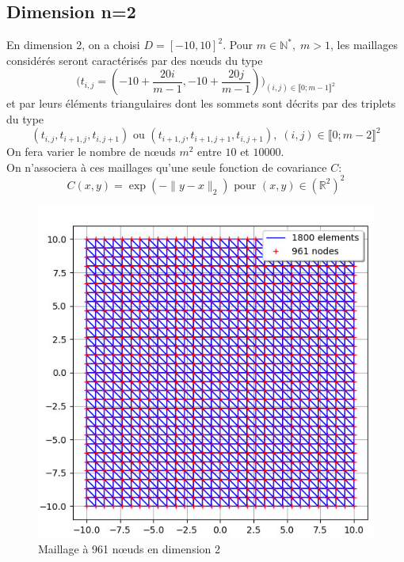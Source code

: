 \subsection{Dimension n=2}
\label{choDim2}
En dimension 2, on a choisi $D = [-10,10]^2$. Pour $m \in \mathbb{N}^{*}, \; m > 1$,
les maillages considérés seront caractérisés par des n\oe uds du type
\begin{equation*} \biggl (t_{i,j} = (-10 + \frac{20i}{m-1}, -10 + \frac{20j}{m-1} )\biggr)_{(i,j) \in \llbracket 0;m-1 \rrbracket^2}  \end{equation*}
et par leurs éléments triangulaires dont les sommets sont décrits par des triplets
du type \begin{equation*}(t_{i,j}, t_{i+1,j}, t_{i,j+1}) \text{ ou } (t_{i+1,j}, t_{i+1,j+1}, t_{i,j+1}) , \; (i,j) \in \llbracket 0;m-2 \rrbracket^2 \end{equation*}
On fera varier le nombre de n\oe uds $m^2$ entre $10$ et $10000$.\\
On n'associera à ces maillages qu'une seule fonction de covariance $C$:
\begin{equation*} C(x,y) = \exp(-\|y-x\|_2) \text{ pour } (x,y) \in (\mathbb{R}^2)^2 \end{equation*}

\begin{figure}[h]
\begin{center}
\includegraphics[scale=0.6]{images/CholeskyDim2-961.jpg}
\caption{Maillage à 961 n\oe uds en dimension 2}
\label{CholeskyMaillageDim2-961}  
\end{center}
\end{figure}

